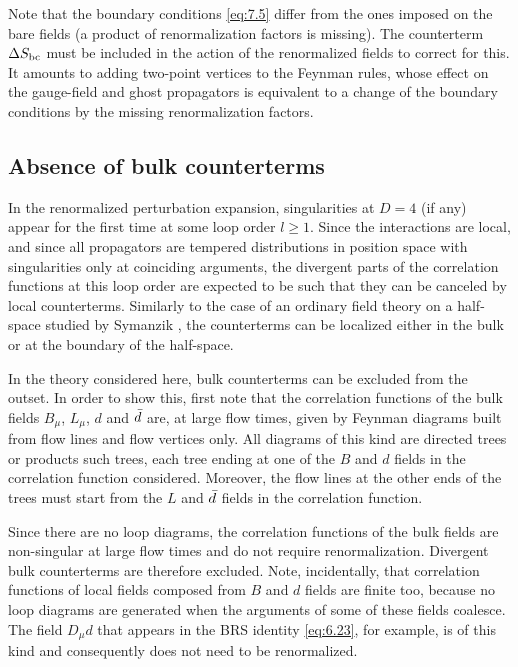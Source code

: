 Note that the boundary conditions \eqref{eq:7.5} differ from
the ones imposed on the bare fields (a product of
renormalization factors is missing).
The counterterm $\Delta S_{\mathrm{bc}}$ must be included
in the action of the renormalized fields
to correct for this.
It amounts to adding two-point vertices to the
Feynman rules, whose effect on the
gauge-field and ghost propagators is
equivalent to a change of the boundary
conditions by the missing renormalization factors.

\subsection{Absence of bulk counterterms}\label{ssec:nobulk}

In the renormalized perturbation expansion,
singularities at $D=4$ (if any) appear for the first time
at some loop order $l\geq1$.
Since the interactions are local, and since
all propagators are tempered distributions in position space
with singularities only at coinciding arguments,
the divergent parts of the correlation functions at
this loop order are expected to be
such that they can be canceled by local counterterms.
Similarly to the case of an ordinary
field theory on a half-space studied by Symanzik \cite{Symanzik},
the counterterms can be localized either in the bulk or at
the boundary of the half-space.

In the theory considered here,
bulk counterterms can be excluded from the outset.
In order to show this, first note that
the correlation functions of the bulk fields
$B_{\mu}$, $L_{\mu}$, $d$ and $\bar{d}$
are, at large flow times, given by
Feynman diagrams built from
flow lines
and flow vertices only.
All diagrams
of this kind are directed trees or products such trees,
each tree ending at one of the $B$ and $d$ fields in
the correlation function considered. Moreover, the
flow lines at the other ends of the trees must
start from the $L$ and $\bar{d}$ fields in the
correlation function.

Since there are no loop diagrams,
the correlation functions of the bulk fields are
non-singular at large flow times and do not require
renormalization.
Divergent bulk counterterms are therefore excluded.
Note, incidentally, that
correlation functions of local fields composed from $B$ and $d$
fields are finite too, because no loop
diagrams are generated when the arguments of some of
these fields coalesce.
The field $D_{\mu}d$ that appears in the BRS
identity \eqref{eq:6.23}, for example, is of this kind
and consequently does not need to be renormalized.

